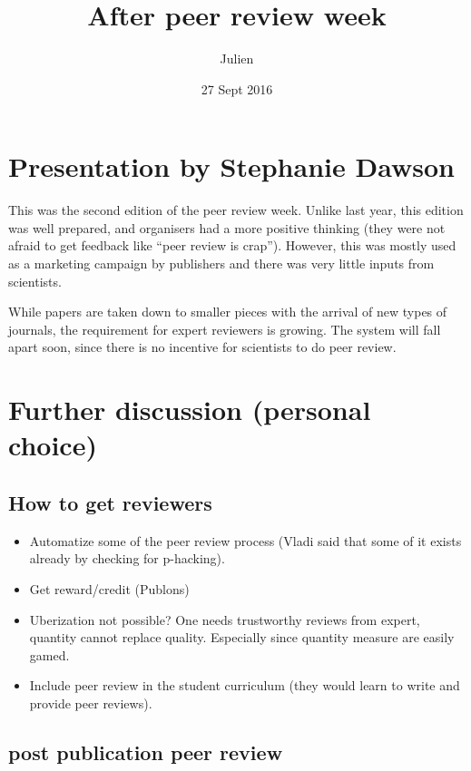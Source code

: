 \documentclass[]{article}
\title{After peer review week}
\author{Julien}
\date{27 Sept 2016}
\begin{document}
\maketitle


{
\hypersetup{linkcolor=black}
\setcounter{tocdepth}{2}
\tableofcontents
}
\section{Presentation by Stephanie
Dawson}\label{presentation-by-stephanie-dawson}

This was the second edition of the peer review week. Unlike last year,
this edition was well prepared, and organisers had a more positive
thinking (they were not afraid to get feedback like ``peer review is
crap''). However, this was mostly used as a marketing campaign by
publishers and there was very little inputs from scientists.

While papers are taken down to smaller pieces with the arrival of new
types of journals, the requirement for expert reviewers is growing. The
system will fall apart soon, since there is no incentive for scientists
to do peer review.

\section{Further discussion (personal
choice)}\label{further-discussion-personal-choice}

\subsection{How to get reviewers}\label{how-to-get-reviewers}

\begin{itemize}
\item
  Automatize some of the peer review process (Vladi said that some of it
  exists already by checking for p-hacking).
\item
  Get reward/credit (Publons)
\item
  Uberization not possible? One needs trustworthy reviews from expert,
  quantity cannot replace quality. Especially since quantity measure are
  easily gamed.
\item
  Include peer review in the student curriculum (they would learn to
  write and provide peer reviews).
\end{itemize}

\subsection{post publication peer
review}\label{post-publication-peer-review}
\end{document}
